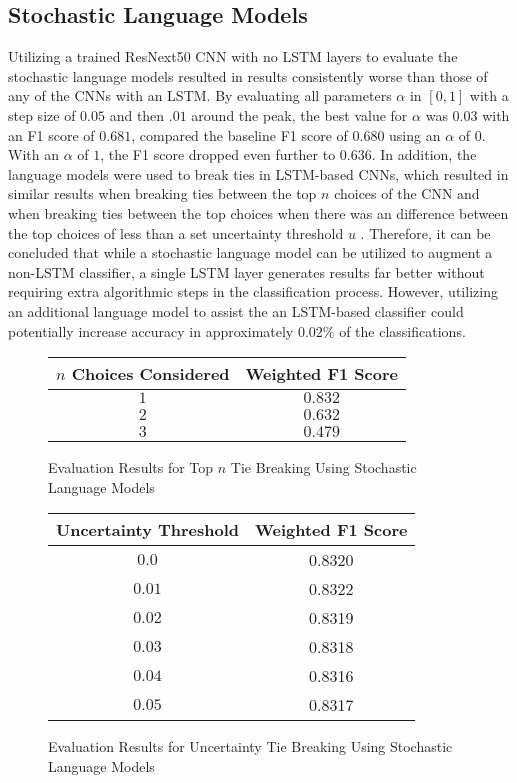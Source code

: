 \subsection{Stochastic Language Models}

Utilizing a trained ResNext50 CNN with no LSTM layers to evaluate the stochastic language models resulted in results consistently worse than those of any of the CNNs with an LSTM. By evaluating all parameters $\alpha$ in $[0,1]$ with a step size of $0.05$ and then $.01$ around the peak, the best value for $\alpha$ was $0.03$ with an F1 score of $0.681$, compared the baseline F1 score of $0.680$ using an $\alpha$ of $0$. With an $\alpha$ of $1$, the F1 score dropped even further to $0.636$. In addition, the language models were used to break ties in LSTM-based CNNs, which resulted in similar results when breaking ties between the top $n$ choices of the CNN  and when breaking ties between the top choices when there was an difference between the top choices of less than a set uncertainty threshold $u$ . Therefore, it can be concluded that while a stochastic language model can be utilized to augment a non-LSTM classifier, a single LSTM layer generates results far better without requiring extra algorithmic steps in the classification process. However, utilizing an additional language model to assist the an LSTM-based classifier could potentially increase accuracy in approximately $0.02\%$ of the classifications.

\begin{figure}[H]
    \caption{Evaluation Results for Top $n$ Tie Breaking Using Stochastic Language Models}
    \label{fig:classificationMarkovTopN}
    \centering
    \begin{tabular}{ | c | c | }
        \hline
        $n$ Choices Considered & Weighted F1 Score \\
        \hline
        $1$ & $0.832$ \\
        $2$ & $0.632$ \\
        $3$ & $0.479$ \\
        \hline
    \end{tabular}
\end{figure}

\begin{figure}[H]
    \caption{Evaluation Results for Uncertainty Tie Breaking Using Stochastic Language Models}
    \label{fig:classificationMarkovUncertainty}
    \centering
    \begin{tabular}{ | c | c | }
        \hline
        Uncertainty Threshold & Weighted F1 Score \\
        \hline
        $0.0$ & 0.8320 \\
        $0.01$ & 0.8322 \\
        $0.02$ & 0.8319 \\
        $0.03$ & 0.8318 \\
        $0.04$ & 0.8316 \\
        $0.05$ & 0.8317 \\
        \hline
    \end{tabular}
\end{figure}

